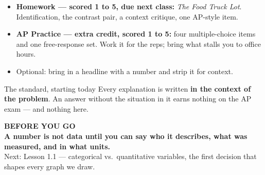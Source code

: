 \documentclass[aspectratio=169, 11pt]{beamer}
\newcommand{\redink}[1]{{\color{redacc}\bfseries #1}}
\begin{document}
\begin{frame}[t, plain]
  \begin{itemize}\setlength{\itemsep}{5pt}
    \item \textbf{Homework --- \redink{scored 1 to 5, due next class}:} \emph{The Food Truck Lot}.
          Identification, the contrast pair, a context critique, one AP-style item.
    \item \textbf{AP Practice --- extra credit, scored 1 to 5:} four multiple-choice items and one
          free-response set. Work it for the reps; bring what stalls you to office hours.
    \item Optional: bring in a headline with a number and strip it for context.
  \end{itemize}
  \begin{block}{The standard, starting today}
    Every explanation is written \textbf{in the context of the problem}. An answer without the
    situation in it earns nothing on the AP exam --- and nothing here.
  \end{block}
\end{frame}

{
\begin{frame}[plain]
  \vspace{1.5cm}\hspace{0.8cm}%
  \begin{minipage}{0.86\textwidth}
    {\color{goldacc}\bfseries\small BEFORE YOU GO}\\[0.7cm]
    {\color{white}\bfseries\Large A number is not data until you can say who it
    describes, what was measured, and in what units.}\\[0.9cm]
    {\color{skymid}\small Next: Lesson 1.1 --- categorical vs.\ quantitative variables,
    the first decision that shapes every graph we draw.}
  \end{minipage}
\end{frame}
}
\end{document}
